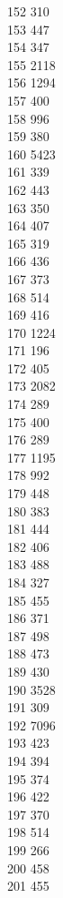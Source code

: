 { 152	310 \\
 153	447 \\
 154	347 \\
 155	2118 \\
 156	1294 \\
 157	400 \\
 158	996 \\
 159	380 \\
 160	5423 \\
 161	339 \\
 162	443 \\
 163	350 \\
 164	407 \\
 165	319 \\
 166	436 \\
 167	373 \\
 168	514 \\
 169	416 \\
 170	1224 \\
 171	196 \\
 172	405 \\
 173	2082 \\
 174	289 \\
 175	400 \\
 176	289 \\
 177	1195 \\
 178	992 \\
 179	448 \\
 180	383 \\
 181	444 \\
 182	406 \\
 183	488 \\
 184	327 \\
 185	455 \\
 186	371 \\
 187	498 \\
 188	473 \\
 189	430 \\
 190	3528 \\
 191	309 \\
 192	7096 \\
 193	423 \\
 194	394 \\
 195	374 \\
 196	422 \\
 197	370 \\
 198	514 \\
 199	266 \\
 200	458 \\
 201	455 \\
}
